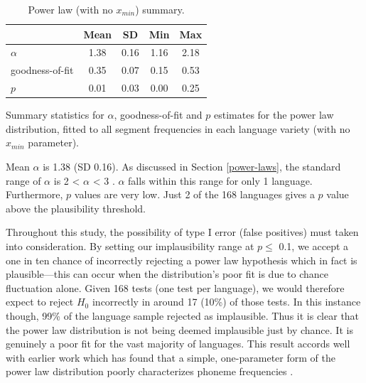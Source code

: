 \begin{table}

\caption{\label{tab:pl-summary}Power law (with no $x_{min}$) summary.}
\centering
\begin{threeparttable}
\begin{tabular}[t]{lcccc}
\toprule
\textbf{ } & \textbf{Mean} & \textbf{SD} & \textbf{Min} & \textbf{Max}\\
\midrule
$\alpha$ & 1.38 & 0.16 & 1.16 & 2.18\\
goodness-of-fit & 0.35 & 0.07 & 0.15 & 0.53\\
$p$ & 0.01 & 0.03 & 0.00 & 0.25\\
\bottomrule
\end{tabular}
\begin{tablenotes}
\item Summary statistics for $\alpha$, goodness-of-fit and $p$ estimates for the power law distribution, fitted to all segment frequencies in each language variety (with no $x_{min}$ parameter).
\end{tablenotes}
\end{threeparttable}
\end{table}

Mean \(\alpha\) is 1.38 (SD 0.16). As discussed in Section \ref{power-laws}, the standard range of \(\alpha\) is 2 \textless{} \(\alpha\) \textless{} 3 \autocite[p.~662]{clauset_power-law_2009}. \(\alpha\) falls within this range for only 1 language. Furthermore, \(p\) values are very low. Just 2 of the 168 languages gives a \(p\) value above the plausibility threshold.

Throughout this study, the possibility of type I error (false positives) must taken into consideration. By setting our implausibility range at \(p \leq\) 0.1, we accept a one in ten chance of incorrectly rejecting a power law hypothesis which in fact is plausible---this can occur when the distribution's poor fit is due to chance fluctuation alone. Given 168 tests (one test per language), we would therefore expect to reject \(H_0\) incorrectly in around 17 (10\%) of those tests. In this instance though, 99\% of the language sample rejected as implausible. Thus it is clear that the power law distribution is not being deemed implausible just by chance. It is genuinely a poor fit for the vast majority of languages. This result accords well with earlier work which has found that a simple, one-parameter form of the power law distribution poorly characterizes phoneme frequencies \autocites{sigurd_rank-frequency_1968}{martindale_comparison_1996}{tambovtsev_phoneme_2007}.


